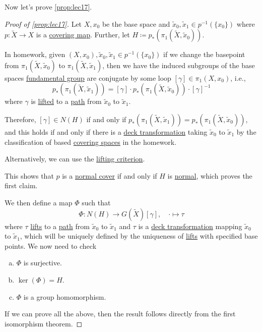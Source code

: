 Now let's prove \autoref{prop:lec17}.

\begin{proof}[Proof of \autoref{prop:lec17}]
	Let \(X, x_0\) be the base space and \(\widetilde{x} _0, \widetilde{x} _1\in p^{-1} (\{x_0\})\) where \(p\colon \widetilde{X} \to X\) is a \hyperref[def:covering-map]{covering map}. Further, let \(H\coloneqq p_\ast(\pi _1(\widetilde{X} , \widetilde{x} _0))\).

	In homework, given \((X, x_0), \widetilde{x} _0, \widetilde{x} _1\in p^{-1} (\{x_0\})\) if we change the basepoint from \(\pi _1(\widetilde{X} , \widetilde{x} _0)\) to \(\pi _1(\widetilde{X} , \widetilde{x} _1)\), then we have the induced subgroups of the base spaces \hyperref[def:fundamental-group]{fundamental group} are conjugate by some loop \([\gamma ]\in \pi _1(X, x_0)\), i.e.,
	\[
		p_\ast (\pi _1(\widetilde{X} , \widetilde{x} _1)) = [\gamma ]\cdot p_\ast (\pi _1(\widetilde{X} , \widetilde{x} _0))\cdot [\gamma ]^{-1}
	\]
	where \(\gamma\) is \hyperref[prop:homotopy-lifting-property]{lifted} to a \hyperref[def:path]{path} from \(\widetilde{x} _0\) to \(\widetilde{x} _1\).

	Therefore, \([\gamma ]\in N(H)\) if and only if \(p_\ast(\pi _1(\widetilde{X} , \widetilde{x} _1)) = p_\ast(\pi _1(\widetilde{X} , \widetilde{x} _0))\), and this holds if and only if there is a \hyperref[def:deck-transformation]{deck transformation} taking \(\widetilde{x} _0\) to \(\widetilde{x} _1\) by the classification of based \hyperref[def:covering-space]{covering spaces} in the homework.
	\begin{note}
		Alternatively, we can use the \hyperref[prop:lifting-criterion]{lifting criterion}.
	\end{note}
	This shows that \(p\) is a \hyperref[def:normal-cover]{normal cover} if and only if \(H\) is \hyperref[def:normal-subgroup]{normal}, which proves the first claim.

	We then define a map \(\Phi \) such that
	\[
		\Phi \colon N(H)\to G(\widetilde{X} )[\gamma ],\quad \cdot \mapsto \tau
	\]
	where \(\tau \) \hyperref[prop:homotopy-lifting-property]{lifts} to a \hyperref[def:path]{path} from \(\widetilde{x} _0\) to \(\widetilde{x} _1\) and \(\tau \) is a \hyperref[def:deck-transformation]{deck transformation} mapping \(\widetilde{x} _0\) to \(\widetilde{x} _1\), which will be uniquely defined by the uniqueness of \hyperref[prop:homotopy-lifting-property]{lifts} with specified base points. We now need to check
	\begin{enumerate}[(a)]
		\item \(\Phi \) is surjective.
		\item \(\ker  (\Phi )= H\).
		\item \(\Phi \) is a group homomorphism.
	\end{enumerate}
	If we can prove all the above, then the result follows directly from the first isomorphism theorem.


\end{proof}
